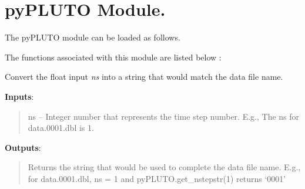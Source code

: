 \documentclass[letterpaper,10pt,english]{sphinxmanual}
\begin{document}
\chapter{pyPLUTO Module.}
\label{index:pypluto-module}
The pyPLUTO module can be loaded as follows.


The functions associated with this module are listed below :
\label{index:module-pyPLUTO}

\begin{fulllineitems}
\label{index:pyPLUTO.get_nstepstr}
Convert the float input \emph{ns} into a string that would match the data file name.

\textbf{Inputs}:
\begin{quote}

ns -- Integer number that represents the time step number. E.g., The ns for data.0001.dbl is 1.
\end{quote}

\textbf{Outputs}:
\begin{quote}

Returns the string that would be used to complete the data file name. E.g., for data.0001.dbl, ns = 1 and pyPLUTO.get\_nstepstr(1) returns `0001'
\end{quote}

\end{fulllineitems}

\end{document}
